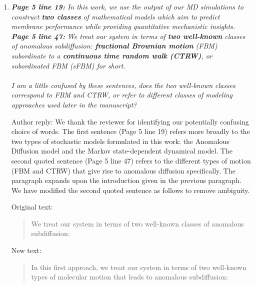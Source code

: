 \documentclass{article}
\begin{document}
\begin{enumerate}[label={Comment \theenumi :}, leftmargin=3.9\parindent]

  \item \textit{\textbf{Page 5 line 19:} In this work, we use the output of our MD simulations
        to construct \textbf{two classes} of mathematical models which aim to predict membrane 
        performance while providing quantitative mechanistic insights. \\
        \textbf{Page 5 line 47:} We treat our system in terms of \textbf{two well-known} classes of 
        anomalous subdiffusion: \textbf{fractional Brownian motion} (FBM) subordinate to a 
        \textbf{continuous time random walk (CTRW)}, or subordinated FBM (sFBM) for short. \\ \\
        I am a little confused by these sentences, does the two well-known classes correspond to FBM
        and CTRW, or refer to different classes of modeling approaches used later in the manuscript?}
  
  
  Author reply: We thank the reviewer for identifying our potentially confusing choice of words.
  The first sentence (Page 5 line 19) refers more broadly to the two types of stochastic models 
  formulated in this work: the Anomalous Diffusion model and the Markov state-dependent dynamical
  model. The second quoted sentence (Page 5 line 47) refers to the different types of
  motion (FBM and CTRW) that give rise to anomalous diffusion specifically. The paragraph expands
  upon the introduction given in the previous paragraph. We have modified the second quoted 
  sentence as follows to remove ambiguity.
  
  Original text:
  \begin{quote}
  We treat our system in terms of two well-known classes of anomalous subdiffusion: 
  \end{quote}
  
  New text:
  \begin{quote}
  In this first approach, we treat our system in terms of two well-known types of molecular
  motion that leads to anomalous subdiffusion: 
  \end{quote}
  

\end{enumerate}
\end{document}
